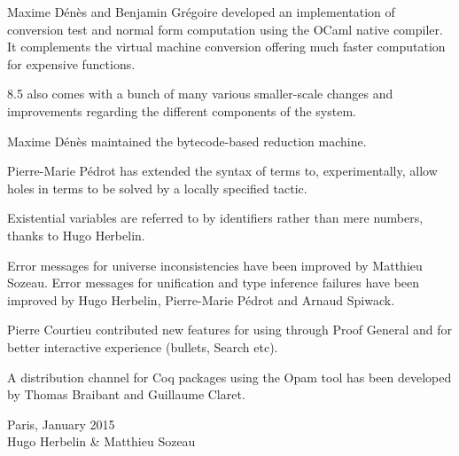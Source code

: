 Maxime Dénès and Benjamin Grégoire developed an implementation of
conversion test and normal form computation using the OCaml native
compiler. It complements the virtual machine conversion offering much
faster computation for expensive functions.

{\Coq} 8.5 also comes with a bunch of many various smaller-scale changes
and improvements regarding the different components of the system.

Maxime Dénès maintained the bytecode-based reduction machine.

Pierre-Marie Pédrot has extended the syntax of terms to,
experimentally, allow holes in terms to be solved by a locally
specified tactic.

Existential variables are referred to by identifiers rather than mere
numbers, thanks to Hugo Herbelin.

Error messages for universe inconsistencies have been improved by
Matthieu Sozeau. Error messages for unification and type inference
failures have been improved by Hugo Herbelin, Pierre-Marie Pédrot and
Arnaud Spiwack.

Pierre Courtieu contributed new features for using {\Coq} through Proof
General and for better interactive experience (bullets, Search etc).

A distribution channel for Coq packages using the Opam tool has been
developed by Thomas Braibant and Guillaume Claret.

\begin{flushright}
Paris, January 2015\\
Hugo Herbelin \& Matthieu Sozeau\\
\end{flushright}







